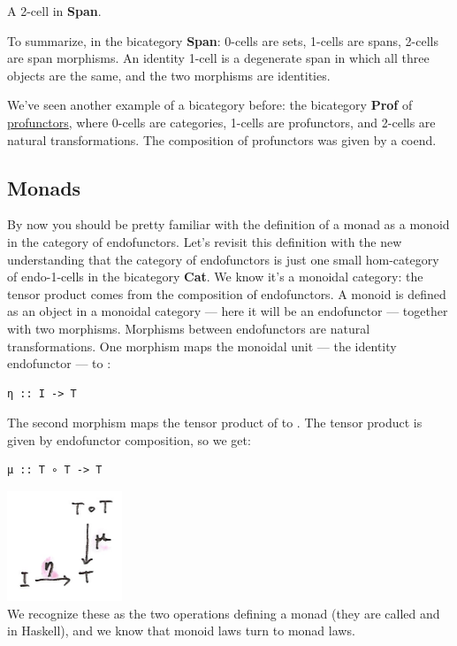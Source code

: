 A 2-cell in \textbf{Span}.

To summarize, in the bicategory \textbf{Span}: 0-cells are sets, 1-cells
are spans, 2-cells are span morphisms. An identity 1-cell is a
degenerate span in which all three objects are the same, and the two
morphisms are identities.

We've seen another example of a bicategory before: the bicategory
\textbf{Prof} of
\href{https://bartoszmilewski.com/2017/03/29/ends-and-coends/}{profunctors},
where 0-cells are categories, 1-cells are profunctors, and 2-cells are
natural transformations. The composition of profunctors was given by a
coend.

\subsection{Monads}\label{monads}

By now you should be pretty familiar with the definition of a monad as a
monoid in the category of endofunctors. Let's revisit this definition
with the new understanding that the category of endofunctors is just one
small hom-category of endo-1-cells in the bicategory \textbf{Cat}. We
know it's a monoidal category: the tensor product comes from the
composition of endofunctors. A monoid is defined as an object in a
monoidal category --- here it will be an endofunctor  ---
together with two morphisms. Morphisms between endofunctors are natural
transformations. One morphism maps the monoidal unit --- the identity
endofunctor --- to :

\begin{verbatim}
η :: I -> T
\end{verbatim}

The second morphism maps the tensor product of  to
. The tensor product is given by endofunctor composition, so
we get:

\begin{verbatim}
μ :: T ∘ T -> T
\end{verbatim}

\includegraphics[width=1.35417in]{images/monad.png}\\
We recognize these as the two operations defining a monad (they are
called  and  in Haskell), and we know that
monoid laws turn to monad laws.

